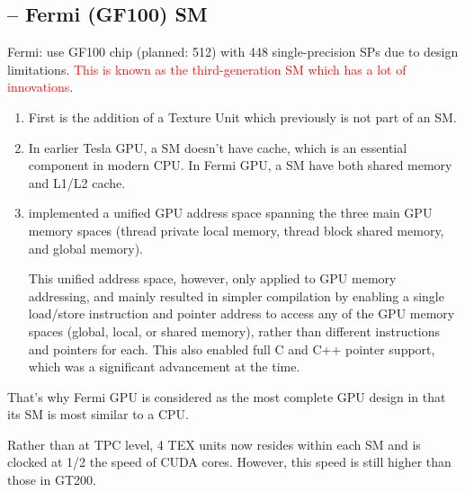 \subsection{-- Fermi (GF100) SM}
\label{sec:SM-Fermi}

Fermi: use GF100 chip (planned: 512) with 448 single-precision SPs due to design
limitations. \textcolor{red}{This is known as the third-generation SM which has
a lot of innovations}. 
\begin{enumerate}
  \item First is the addition of a Texture Unit which previously
is not part of an SM.
  
  \item  In earlier Tesla GPU, a SM doesn't have cache, which is an essential
  component
in modern CPU. In Fermi GPU, a SM have both shared memory and L1/L2 cache.

   \item implemented a unified GPU address space spanning the three main GPU
   memory spaces (thread private local memory, thread block shared memory, and
   global memory). 
   
This unified address space, however, only applied to GPU memory addressing, and
mainly resulted in simpler compilation by enabling a single load/store
instruction and pointer address to access any of the GPU memory spaces (global,
local, or shared memory), rather than different instructions and pointers for
each. This also enabled full C and C++ pointer support, which was a significant
advancement at the time.
\end{enumerate}

That's why Fermi GPU is considered as the most complete GPU design in that its
SM is most similar to a CPU. 

 \begin{framed}
    
    Rather than at TPC level, 4 TEX units now resides within each SM
    and is clocked at 1/2 the speed of CUDA cores. However, this speed is 
    still higher
    than those in GT200.
  \end{framed}  

